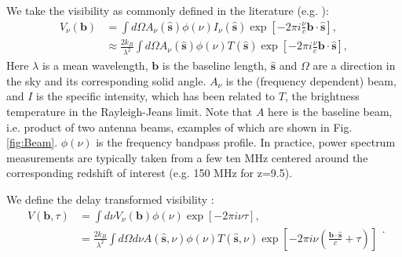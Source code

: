 \documentclass[preprint2,numberedappendix,tighten,twocolappendix]{aastex6}  %
\renewcommand\[{\begin{equation}}
\renewcommand\]{\end{equation}}
\begin{document}
We take the visibility as commonly defined in the literature (e.g.
\cite{first-paper}): 
\begin{equation}
\begin{aligned}V_{\nu}(\boldsymbol{b}) & =\int d\Omega A_{\nu}(\hat{\boldsymbol{s}})\phi(\nu)I_{\nu}(\hat{\boldsymbol{s}})\exp\left[-2\pi i\frac{\nu}{c}\boldsymbol{b}\cdot\hat{\boldsymbol{s}}\right],\\
 & \approx\frac{2k_{B}}{\lambda^{2}}\int d\Omega A_{\nu}(\hat{\boldsymbol{s}})\phi(\nu)T(\hat{\boldsymbol{s}})\exp\left[-2\pi i\frac{\nu}{c}\boldsymbol{b}\cdot\hat{\boldsymbol{s}}\right],
\end{aligned}
\label{eq:Vis1}
\end{equation}
Here $\lambda$ is a mean wavelength, $\boldsymbol{b}$ is the baseline
length, $\hat{\boldsymbol{s}}$ and $\Omega$ are a direction in the
sky and its corresponding solid angle. $A_{\nu}$ is the (frequency
dependent) beam, and $I$ is the specific intensity, which has been
related to $T$, the brightness temperature in the Rayleigh-Jeans
limit. Note that $A$ here is the baseline beam, i.e. product of two antenna beams, examples of which are shown in Fig.\ref{fig:Beam}. $\phi(\nu)$ is the frequency bandpass profile. In practice,
power spectrum measurements are typically taken from a few ten MHz centered around the corresponding redshift of interest (e.g. 150 MHz for z=9.5). 

We define the delay transformed visibility \cite{delay-transform}:
\small
\begin{equation}
\begin{aligned}V(\boldsymbol{b},\tau) & =\int d\nu V_{\nu}(\boldsymbol{b})\phi(\nu)\exp\left[-2\pi i\nu\tau\right],\\
 & =\frac{2k_{B}}{\lambda^{2}}\int d\Omega d\nu A(\hat{\boldsymbol{s}},\nu)\phi(\nu)T(\hat{\boldsymbol{s}},\nu)\exp\left[-2\pi i\nu\left(\frac{\boldsymbol{b}\cdot\hat{\boldsymbol{s}}}{c}+\tau\right)\right]
\end{aligned}
.\label{eq:Vb1}
\end{equation}
\normalsize
\end{document}
